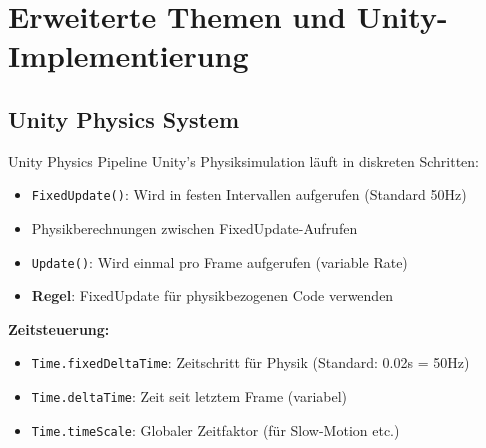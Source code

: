 \section{Erweiterte Themen und Unity-Implementierung}

\subsection{Unity Physics System}

\begin{concept}{Unity Physics Pipeline}
    Unity's Physiksimulation läuft in diskreten Schritten:
    \begin{itemize}
        \item \texttt{FixedUpdate()}: Wird in festen Intervallen aufgerufen (Standard 50Hz)
        \item Physikberechnungen zwischen FixedUpdate-Aufrufen
        \item \texttt{Update()}: Wird einmal pro Frame aufgerufen (variable Rate)
        \item \textbf{Regel}: FixedUpdate für physikbezogenen Code verwenden
    \end{itemize}
    
    \textbf{Zeitsteuerung:}
    \begin{itemize}
        \item \texttt{Time.fixedDeltaTime}: Zeitschritt für Physik (Standard: 0.02s = 50Hz)
        \item \texttt{Time.deltaTime}: Zeit seit letztem Frame (variabel)
        \item \texttt{Time.timeScale}: Globaler Zeitfaktor (für Slow-Motion etc.)
    \end{itemize}
\end{concept}



